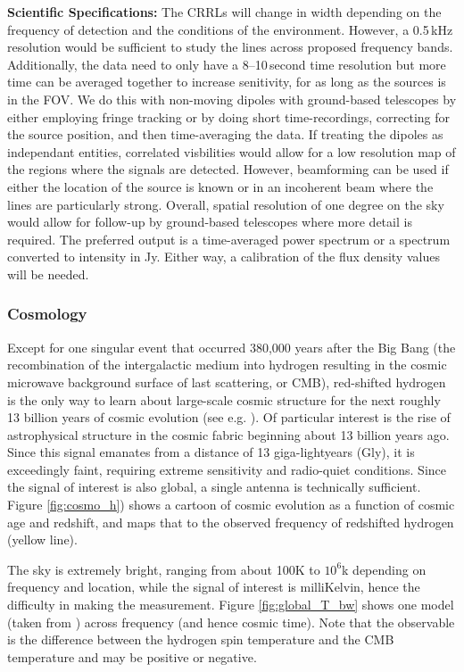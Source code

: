 \textbf{Scientific Specifications:} The CRRLs will change in width depending on the frequency of detection and the conditions of the environment. However, a 0.5\,kHz resolution would be sufficient to study the lines across proposed frequency bands. Additionally, the data need to only have a 8--10\,second time resolution but more time can be averaged together to increase senitivity, for as long as the sources is in the FOV. We do this with non-moving dipoles with ground-based telescopes by either employing fringe tracking or by doing short time-recordings, correcting for the source position, and then time-averaging the data. If treating the dipoles as independant entities, correlated visbilities would allow for a low resolution map of the regions where the signals are detected. However, beamforming can be used if either the location of the source is known or in an incoherent beam where the lines are particularly strong. Overall, spatial resolution of one degree on the sky would allow for follow-up by ground-based telescopes where more detail is required. The preferred output is a time-averaged power spectrum or a spectrum converted to intensity in Jy. Either way, a calibration of the flux density values will be needed.

\subsubsection{Cosmology}
Except for one singular event that occurred 380,000 years after the Big Bang (the recombination of the intergalactic medium into hydrogen resulting in the cosmic microwave background surface of last scattering, or CMB), red-shifted hydrogen is the only way to learn about large-scale cosmic structure for the next roughly 13 billion years of cosmic evolution (see e.g. \citealt{Fialkov_2024}).  Of particular interest is the rise of astrophysical structure in the cosmic fabric beginning about 13 billion years ago.  Since this signal emanates from a distance of 13 giga-lightyears (Gly), it is exceedingly faint, requiring extreme sensitivity and radio-quiet conditions.  Since the signal of interest is also global, a single antenna is technically sufficient.  Figure \ref{fig:cosmo_h}) shows a cartoon of cosmic evolution as a function of cosmic age and redshift, and maps that to the observed frequency of redshifted hydrogen (yellow line).

The sky is extremely bright, ranging from about 100K to $10^6$k depending on frequency and location, while the signal of interest is milliKelvin, hence the difficulty in making the measurement.  Figure \ref{fig:global_T_bw} shows one model (taken from \citealt{Fialkov_2024}) across frequency (and hence cosmic time).  Note that the observable is the difference between the hydrogen spin temperature and the CMB temperature and may be positive or negative.

